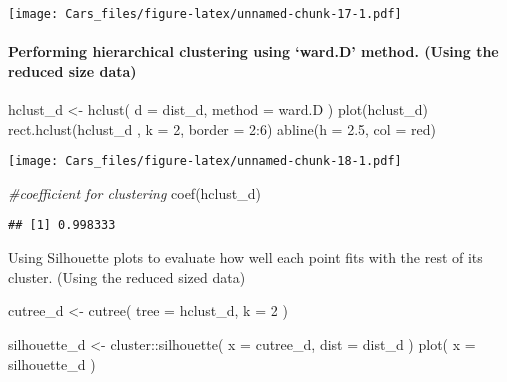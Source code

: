\documentclass[
]{article}
\newenvironment{Shaded}{\begin{snugshade}}{\end{snugshade}}
\newcommand{\AttributeTok}[1]{\textcolor[rgb]{0.77,0.63,0.00}{#1}}
\newcommand{\CommentTok}[1]{\textcolor[rgb]{0.56,0.35,0.01}{\textit{#1}}}
\newcommand{\DecValTok}[1]{\textcolor[rgb]{0.00,0.00,0.81}{#1}}
\newcommand{\FloatTok}[1]{\textcolor[rgb]{0.00,0.00,0.81}{#1}}
\newcommand{\FunctionTok}[1]{\textcolor[rgb]{0.00,0.00,0.00}{#1}}
\newcommand{\NormalTok}[1]{#1}
\newcommand{\OtherTok}[1]{\textcolor[rgb]{0.56,0.35,0.01}{#1}}
\newcommand{\SpecialCharTok}[1]{\textcolor[rgb]{0.00,0.00,0.00}{#1}}
\newcommand{\StringTok}[1]{\textcolor[rgb]{0.31,0.60,0.02}{#1}}
\begin{document}
\texttt{[image: Cars\_files/figure-latex/unnamed-chunk-17-1.pdf]}

\hypertarget{performing-hierarchical-clustering-using-ward.d-method.-using-the-reduced-size-data}{%
\paragraph{Performing hierarchical clustering using `ward.D' method.
(Using the reduced size
data)}\label{performing-hierarchical-clustering-using-ward.d-method.-using-the-reduced-size-data}}

\begin{Shaded}
\begin{Highlighting}[]
\NormalTok{hclust\_d }\OtherTok{\textless{}{-}} \FunctionTok{hclust}\NormalTok{(}
  \AttributeTok{d =}\NormalTok{ dist\_d,}
  \AttributeTok{method =} \StringTok{\textquotesingle{}ward.D\textquotesingle{}}
\NormalTok{)}
\FunctionTok{plot}\NormalTok{(hclust\_d)}
\FunctionTok{rect.hclust}\NormalTok{(hclust\_d , }\AttributeTok{k =} \DecValTok{2}\NormalTok{, }\AttributeTok{border =} \DecValTok{2}\SpecialCharTok{:}\DecValTok{6}\NormalTok{)}
\FunctionTok{abline}\NormalTok{(}\AttributeTok{h =} \FloatTok{2.5}\NormalTok{, }\AttributeTok{col =} \StringTok{\textquotesingle{}red\textquotesingle{}}\NormalTok{)}
\end{Highlighting}
\end{Shaded}

\texttt{[image: Cars\_files/figure-latex/unnamed-chunk-18-1.pdf]}

\begin{Shaded}
\begin{Highlighting}[]
\CommentTok{\#coefficient for clustering}
\FunctionTok{coef}\NormalTok{(hclust\_d)}
\end{Highlighting}
\end{Shaded}

\begin{verbatim}
## [1] 0.998333
\end{verbatim}

Using Silhouette plots to evaluate how well each point fits with the
rest of its cluster. (Using the reduced sized data)

\begin{Shaded}
\begin{Highlighting}[]
\NormalTok{cutree\_d }\OtherTok{\textless{}{-}} \FunctionTok{cutree}\NormalTok{(}
  \AttributeTok{tree =}\NormalTok{ hclust\_d,}
  \AttributeTok{k =} \DecValTok{2}
\NormalTok{)}

\NormalTok{silhouette\_d }\OtherTok{\textless{}{-}}\NormalTok{ cluster}\SpecialCharTok{::}\FunctionTok{silhouette}\NormalTok{(}
  \AttributeTok{x =}\NormalTok{ cutree\_d,}
  \AttributeTok{dist =}\NormalTok{ dist\_d}
\NormalTok{)}
\FunctionTok{plot}\NormalTok{(}
  \AttributeTok{x =}\NormalTok{ silhouette\_d}
\NormalTok{)}
\end{Highlighting}
\end{Shaded}
\end{document}
